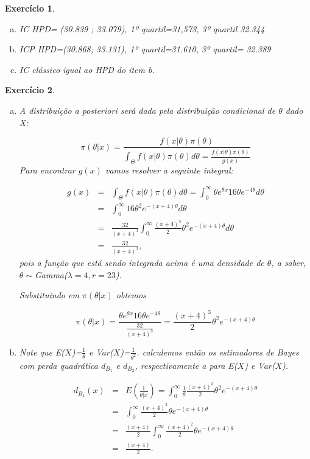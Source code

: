 \documentclass[letter,11pt]{article}
\newtheorem{exer}{Exercício}
\begin{document}
\begin{exer} \rm
\begin{enumerate}[a)]

\item IC HPD= (30.839 ; 33.079), 1º quartil=31,573, 3º quartil 32.344

\item ICP HPD=(30.868; 33.131), 1º quartil=31.610, 3º quartil= 32.389

\item IC clássico igual ao HPD do item b.
\end{enumerate}
\end{exer}


\begin{exer} \rm
\begin{enumerate}[a)]
\item 


A distribuição a posteriori será dada pela distribuição  condicional de $\theta$ dado X:

\[\pi(\theta|x)=\frac{f(x|\theta)\pi(\theta)}{\int_{\Theta}f(x|\theta)\pi(\theta)d\theta=\frac{f(x|\theta)\pi(\theta)}{g(x)} }\]
Para encontrar $g(x)$ vamos resolver a seguinte integral:

\begin{eqnarray}
g(x)&=&\int_{\Theta}f(x|\theta)\pi(\theta)d\theta=\int_{0}^{\infty}\theta e^{\theta x} 16\theta e^{-4\theta}d\theta\\
&=&\int_{0}^{\infty}16\theta^2 e^{-(x+4)\theta }d\theta\\
&=&\frac{32}{(x+4)^3} \int_{0}^{\infty}  \frac{(x+4)^3}{2}\theta^2 e^{-(x+4)\theta}d\theta\\
&=&\frac{32}{(x+4)^3},
\end{eqnarray}
pois a função que está sendo integrada acima é uma densidade de $\theta$, a saber, $\theta\sim $Gamma($\lambda=4,r=23$).

Substituindo em $\pi(\theta|x)$ obtemos 

\[\pi(\theta|x)=\frac{\theta e^{\theta x} 16\theta e^{-4\theta}}{\frac{32}{(x+4)^3}}=\frac{(x+4)^3}{2}\theta^2 e^{-(x+4)\theta}\]

\item Note que E($X$)=$\frac{1}{\theta}$ e Var($X$)=$\frac{1}{\theta^2}$. calculemos então os estimadores de Bayes com perda quadrática $d_{B_1}$ e $d_{B_2}$, respectivamente a para E($X$) e Var($X$).

\begin{eqnarray}
d_{B_1}(x)&=&E(\frac{1}{\theta|x})=\int_{0}^{\infty}\frac{1}{\theta}\frac{(x+4)^3}{2}\theta^2
 e^{-(x+4)\theta}\\
 &=&\int_{0}^{\infty}\frac{(x+4)^3}{2}\theta e^{-(x+4)\theta}\\
 &=& \frac{(x+4)}{2}\int_{0}^{\infty}\frac{(x+4)^2}{2}\theta e^{-(x+4)\theta}\\
 &=& \frac{(x+4)}{2}.
\end{eqnarray}



\end{enumerate}
\end{exer}
\end{document}
